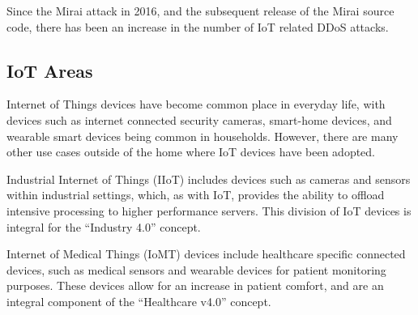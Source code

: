 Since the Mirai attack in 2016, and the subsequent release of the Mirai source
code, there has been an increase in the number of IoT related DDoS
attacks\cite{Salim2019}.

\subsection{IoT Areas}

Internet of Things devices have become common place in everyday life, with
devices such as internet connected security cameras, smart-home devices, and
wearable smart devices being common in households. However, there are many other
use cases outside of the home where IoT devices have been adopted.

Industrial Internet of Things (IIoT) includes devices such as cameras and sensors
within industrial settings, which, as with IoT, provides the ability to offload
intensive processing to higher performance servers\cite{iiot_2019}. This division
of IoT devices is integral for the ``Industry 4.0'' concept.

Internet of Medical Things (IoMT) devices include healthcare specific connected
devices, such as medical sensors and wearable devices for patient monitoring
purposes\cite{iomt_2019}. These devices allow for an increase in patient comfort,
and are an integral component of the ``Healthcare v4.0'' concept.
